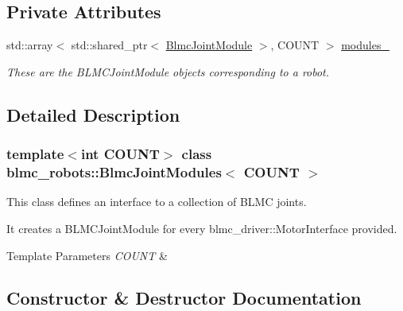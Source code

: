 \subsection*{Private Attributes}
\begin{DoxyCompactItemize}
\item 
\mbox{\label{classblmc__robots_1_1BlmcJointModules_a40ab7b84d3b54d298209098cdf81a14d}} 
std\+::array$<$ std\+::shared\+\_\+ptr$<$ \hyperlink{classblmc__robots_1_1BlmcJointModule}{Blmc\+Joint\+Module} $>$, C\+O\+U\+NT $>$ \hyperlink{classblmc__robots_1_1BlmcJointModules_a40ab7b84d3b54d298209098cdf81a14d}{modules\+\_\+}
\begin{DoxyCompactList}\small\item\em These are the B\+L\+M\+C\+Joint\+Module objects corresponding to a robot. \end{DoxyCompactList}\end{DoxyCompactItemize}


\subsection{Detailed Description}
\subsubsection*{template$<$int C\+O\+U\+NT$>$\newline
class blmc\+\_\+robots\+::\+Blmc\+Joint\+Modules$<$ C\+O\+U\+N\+T $>$}

This class defines an interface to a collection of B\+L\+MC joints. 

It creates a B\+L\+M\+C\+Joint\+Module for every blmc\+\_\+driver\+::\+Motor\+Interface provided.


\begin{DoxyTemplParams}{Template Parameters}
{\em C\+O\+U\+NT} & \\
\hline
\end{DoxyTemplParams}


\subsection{Constructor \& Destructor Documentation}
\mbox{\label{classblmc__robots_1_1BlmcJointModules_a74910d81a89f9b1713ce8fecc69191fe}} 
